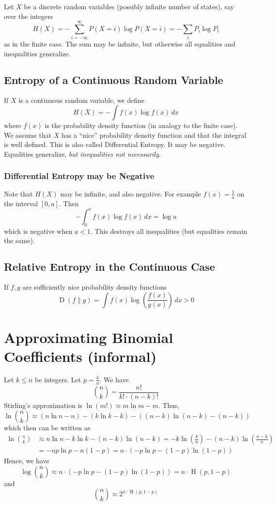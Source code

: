 \documentclass{article}
\begin{document}
Let $X$ be a discrete random variables (possibly infinite number of states), say over the integers 
\[
H(X)=-\sum_{i=-\infty}^{\infty}P(X=i)\log P(X=i)=-\sum_i P_i \log P_i
\]
as in the finite case. The sum may be infinite, but otherwise all equalities and inequalities generalize.

\subsection{Entropy of a Continuous Random Variable}

If $X$ is a continuous random variable, we define 
\[
H(X) = -\int f(x)\log f(x) \, dx
\]
where $f(x)$ is the probability density function (in analogy to the finite case). We assume that $X$ has a ``nice'' probability density function and that the integral is well defined. This is also called Differential Entropy. It may be negative. Equalities generalize, \textit{but inequalities not necessarily}.

\subsubsection{Differential Entropy may be Negative}

Note that $H(X)$ may be infinite, and also negative. For example $f(x)=\frac{1}{a}$ on the interval $[0,a]$. Then
\[
-\int_0^a f(x)\log f(x)\, dx = \log a
\]
which is negative when $a< 1$. This destroys all inequalities (but equalities remain the same).

\subsection{Relative Entropy in the Continuous Case}

If $f,g$ are sufficiently nice probability density functions 
\[
\operatorname{D}(f\| g)=\int f(x)\log\left(\frac{f(x)}{g(x)}\right)\, dx >0
\]

\section{Approximating Binomial Coefficients (informal)}

Let $k\leq n$ be integers. Let $p=\frac{k }{n }$. We have 
\[
\binom{n }{k }=\frac{n!}{k!\cdot \left(n-k\right)!}
\]
Stirling's approximation is $\ln(m!)\approx m\ln m-m$. Thus,
\[
\ln\binom{n }{k }\approx \left(n\ln n -n\right)- \left(k\ln k -k\right) - \left(\left(n-k\right)\ln\left(n-k\right)-\left(n-k\right)\right)
\]
which then can be written as 
\[
\]
\begin{align*}
    \ln\binom{n }{k }&\approx n\ln n -k\ln k - \left(n-k\right)\ln \left(n-k\right) = -k \ln \left(\frac{k}{n}\right) - \left(n-k\right) \ln \left(\frac{n-k}{n}\right)\\
    &= -np\ln p - n \left(1-p\right)=n\cdot\left(-p\ln p -\left(1-p\right)\ln\left(1-p\right)\right)
\end{align*}
Hence, we have 
\[
\log \binom{n }{k } \approx n\cdot \left(-p\ln p -\left(1-p\right)\ln\left(1-p\right)\right) = n\cdot \operatorname{H}\left(p, 1-p\right)
\]
and 
\[
\binom{n }{k } \approx 2^{n\cdot \operatorname{H}\left(p, 1-p\right)}
\]
\end{document}
